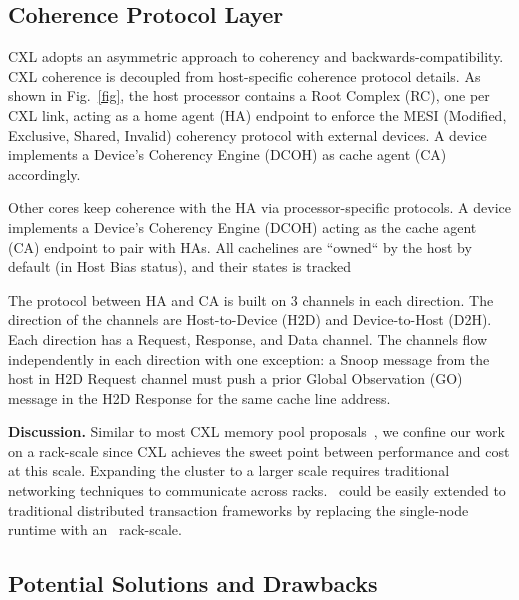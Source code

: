 \subsection{Coherence Protocol Layer}

CXL adopts an asymmetric approach to coherency and backwards-compatibility. CXL coherence is decoupled from host-specific coherence protocol details. As shown in Fig.~\ref{fig}, the host processor contains a Root Complex (RC), one per CXL link, acting as a home agent (HA) endpoint to enforce the MESI (Modified, Exclusive, Shared, Invalid) coherency protocol with external devices. A device implements a Device's Coherency Engine (DCOH) as cache agent (CA) accordingly. 

Other cores keep coherence with the HA via processor-specific protocols. A device implements a Device's Coherency Engine (DCOH) acting as the cache agent (CA) endpoint to pair with HAs. All cachelines are ``owned`` by the host by default (in Host Bias status), and their states is tracked 

The protocol between HA and CA is built on 3 channels in each direction. The direction of the channels are Host-to-Device (H2D) and Device-to-Host (D2H). Each direction has a Request, Response, and Data channel. The channels flow independently in each direction with one exception: a Snoop message from the host in H2D Request channel must push a prior Global Observation (GO) message in the H2D Response for the same cache line address. 


\noindent \textbf{Discussion. }
Similar to most CXL memory pool proposals~\cite{pond, partial, xxx}, we confine our work on a rack-scale since CXL achieves the sweet point between performance and cost at this scale. 
Expanding the cluster to a larger scale requires traditional networking techniques to communicate across racks. \name~could be easily extended to traditional distributed transaction frameworks by replacing the single-node runtime with an \name~rack-scale. 


\subsection{Potential Solutions and Drawbacks}

